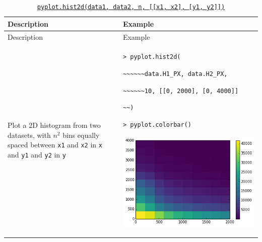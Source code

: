 \documentclass[10pt,a4paperpaper,]{article}
\begin{document}
\begin{longtable}[]{@{}ll@{}}
\caption{\href{http://matplotlib.org/api/pyplot_api.html\#matplotlib.pyplot.hist2d}{\texttt{pyplot.hist2d(data1,\ data2,\ n,\ {[}{[}x1,\ x2{]},\ {[}y1,\ y2{]}{]})}}}\tabularnewline
\toprule
\begin{minipage}[b]{0.47\columnwidth}\raggedright\strut
Description\strut
\end{minipage} & \begin{minipage}[b]{0.47\columnwidth}\raggedright\strut
Example\strut
\end{minipage}\tabularnewline
\midrule
\endfirsthead
\toprule
\begin{minipage}[b]{0.47\columnwidth}\raggedright\strut
Description\strut
\end{minipage} & \begin{minipage}[b]{0.47\columnwidth}\raggedright\strut
Example\strut
\end{minipage}\tabularnewline
\midrule
\endhead
\begin{minipage}[t]{0.47\columnwidth}\raggedright\strut
Plot a 2D histogram from two datasets, with \(n^2\) bins equally spaced
between \texttt{x1} and \texttt{x2} in \texttt{x} and \texttt{y1} and
\texttt{y2} in \texttt{y}\strut
\end{minipage} & \begin{minipage}[t]{0.47\columnwidth}\raggedright\strut
\texttt{\textgreater{}\ pyplot.hist2d(}

\texttt{\textasciitilde{}\textasciitilde{}\textasciitilde{}\textasciitilde{}\textasciitilde{}\textasciitilde{}data.H1\_PX,\ data.H2\_PX,}

\texttt{\textasciitilde{}\textasciitilde{}\textasciitilde{}\textasciitilde{}\textasciitilde{}\textasciitilde{}10,\ {[}{[}0,\ 2000{]},\ {[}0,\ 4000{]}{]}}

\texttt{\textasciitilde{}\textasciitilde{})}

\texttt{\textgreater{}\ pyplot.colorbar()}

\includegraphics[width=\textwidth]{assets/02-hist2d.png}\strut
\end{minipage}\tabularnewline
\bottomrule
\end{longtable}
\end{document}
